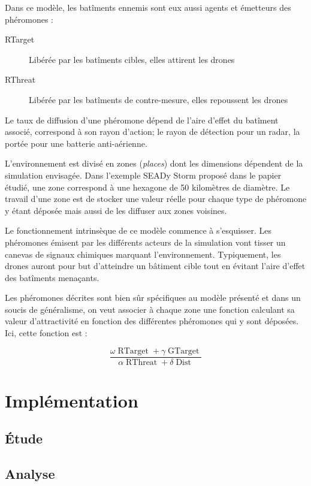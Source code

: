 \documentclass[12pt]{article}
\begin{document}
Dans ce modèle, les batîments ennemis sont eux aussi agents et émetteurs des phéromones :

\begin{description}
  \item[RTarget]{Libérée par les batîments cibles, elles attirent les drones}
  \item[RThreat]{Libérée par les batîments de contre-mesure, elles repoussent les drones}
\end{description}

Le taux de diffusion d'une phéromone dépend de l'aire d'effet du batîment associé, correspond à son rayon d'action; 
le rayon de détection pour un radar, la portée pour une batterie anti-aérienne.

L'environnement est divisé en zones (\textit{places}) dont les dimensions dépendent de la simulation envisagée. 
Dans l'exemple SEADy Storm proposé dans le papier étudié, une zone correspond à une hexagone de 50 kilomètres de diamètre.
Le travail d'une zone est de stocker une valeur réelle pour chaque type de phéromone y étant déposée mais aussi de les diffuser aux zones
voisines.

Le fonctionnement intrinsèque de ce modèle commence à s'esquisser. Les phéromones émisent par les
différents acteurs de la simulation vont tisser un canevas de signaux chimiques marquant l'environnement.
Typiquement, les drones auront pour but d'atteindre un bâtiment cible tout en évitant l'aire d'effet des
batîments menaçants.

Les phéromones décrites sont bien sûr spécifiques au modèle présenté et dans un soucis
de généralisme, on veut associer à chaque zone une fonction calculant sa valeur d'attractivité
en fonction des différentes phéromones qui y sont déposées. Ici, cette fonction est :

$$
\frac{\omega \operatorname{RTarget} + \gamma \operatorname{GTarget}}{\alpha \operatorname{RThreat} + \delta \operatorname{Dist}}
$$


\section{Implémentation}

\subsection{\'Etude}

\subsection{Analyse}



\end{document}
